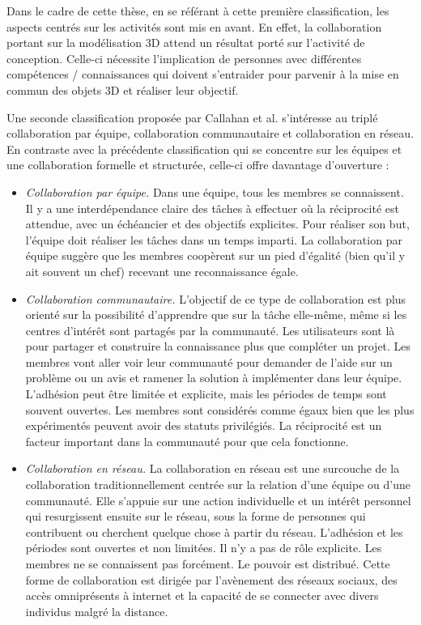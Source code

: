 Dans le cadre de cette thèse, en se référant à cette première classification, les 
aspects centrés sur les activités sont mis en avant. En effet, la collaboration 
portant sur la modélisation 3D attend un résultat porté sur l'activité de conception. 
Celle-ci nécessite l'implication de personnes avec différentes compétences / 
connaissances qui doivent s'entraider pour parvenir à la mise en commun des 
objets 3D et réaliser leur objectif. 

Une seconde classification proposée par Callahan et al. 
\cite{Callahan2008} s'intéresse au triplé \og{} collaboration par équipe\fg{}, \og{} collaboration 
communautaire\fg{} et \og{} collaboration en réseau\fg{}. En contraste avec la précédente 
classification qui se concentre sur les équipes et une collaboration formelle et 
structurée, celle-ci offre davantage d'ouverture :
\begin{itemize}
	\item \textit{Collaboration par équipe.}
	Dans une équipe, tous les membres se connaissent. Il y a une interdépendance 
	claire des tâches à effectuer où la réciprocité est attendue, avec un échéancier 
	et des objectifs explicites. Pour réaliser son but, l'équipe doit réaliser les tâches 
	dans un temps imparti. La collaboration par équipe suggère que les membres 
	coopèrent sur un pied d'égalité (bien qu'il y ait souvent un chef) recevant une 
	reconnaissance égale.
	
	\item \textit{Collaboration communautaire.}
	L'objectif de ce type de collaboration est plus orienté sur la possibilité 
	d'apprendre que sur la tâche elle-même, même si les centres d'intérêt sont 
	partagés par la communauté. Les utilisateurs sont là pour partager et construire 
	la connaissance plus que compléter un projet. Les membres vont aller voir leur 
	communauté pour demander de l'aide sur un problème ou un avis et ramener la 
	solution à implémenter dans leur équipe. L'adhésion peut être limitée et 
	explicite, mais les périodes de temps sont souvent ouvertes. Les membres 
	sont considérés comme égaux bien que les plus expérimentés peuvent avoir 
	des statuts privilégiés. La réciprocité est un facteur important dans la 
	communauté pour que cela fonctionne.
	
	\item \textit{Collaboration en réseau.}
	La collaboration en réseau est une surcouche de la collaboration 
	traditionnellement centrée sur la relation d'une équipe ou d'une communauté. 
	Elle s'appuie sur une action individuelle et un intérêt personnel qui resurgissent 
	ensuite sur le réseau, sous la forme de personnes qui contribuent ou cherchent 
	quelque chose à partir du réseau. L'adhésion et les périodes sont ouvertes et 
	non limitées. Il n'y a pas de rôle explicite. Les membres ne se connaissent pas 
	forcément. Le pouvoir est distribué. Cette forme de collaboration est dirigée par 
	l'avènement des réseaux sociaux, des accès omniprésents à internet et la 
	capacité de se connecter avec divers individus malgré la distance.
\end{itemize}
